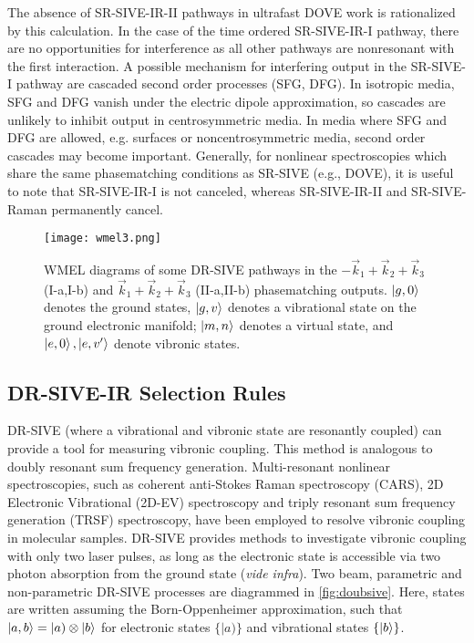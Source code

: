 \documentclass[aip, jcp, draft, onecolumn]{revtex4-2}
\begin{document}
The absence of SR-SIVE-IR-II pathways in ultrafast DOVE work is rationalized by this calculation. \cite{RN367, McDonnell2024}
In the case of the time ordered SR-SIVE-IR-I pathway, there are no opportunities for interference as all other pathways are nonresonant with the first interaction. 
A possible mechanism for interfering output in the SR-SIVE-I pathway are cascaded second order processes (SFG, DFG). \cite{RN243, RN300}
In isotropic media, SFG and DFG vanish under the electric dipole approximation,\cite{Zhu87} so cascades are unlikely to inhibit output in centrosymmetric media.
In media where SFG and DFG are allowed, e.g. surfaces or noncentrosymmetric media, second order cascades may become important. 
Generally, for nonlinear spectroscopies which share the same phasematching conditions as SR-SIVE (e.g., DOVE), it is useful to note that SR-SIVE-IR-I is not canceled, whereas SR-SIVE-IR-II and SR-SIVE-Raman permanently cancel.

\begin{figure}[!htbp]
	\centering
	\texttt{[image: wmel3.png]}
	\caption{WMEL diagrams of some DR-SIVE pathways in the $-\vec{k}_1 + \vec{k}_2+ \vec{k}_3$  (I-a,I-b) and $\vec{k}_1 + \vec{k}_2+ \vec{k}_3$ (II-a,II-b) phasematching outputs. $\ket{g,0}$ denotes the ground states, $\ket{g,v}$ denotes a vibrational state on the ground electronic manifold; $\ket{m,n}$ denotes a virtual state, and $\ket{e,0}, \ket{e,v'}$ denote vibronic states.}
	\label{fig:doubsive}
\end{figure}

\subsection{DR-SIVE-IR Selection Rules} %
DR-SIVE (where a vibrational and vibronic state are resonantly coupled) can provide a tool for measuring vibronic coupling.
This method is analogous to doubly resonant sum frequency generation. \cite{Shen94}
Multi-resonant nonlinear spectroscopies, such as coherent anti-Stokes Raman spectroscopy (CARS), 2D Electronic Vibrational (2D-EV) spectroscopy and triply resonant sum frequency generation (TRSF) spectroscopy, have been employed to resolve vibronic coupling in molecular samples. \cite{Carlson1990, Gaynor2017, RN276}
DR-SIVE provides methods to investigate vibronic coupling with only two laser pulses, as long as the electronic state is accessible via two photon absorption from the ground state (\textit{vide infra}).
Two beam, parametric and non-parametric DR-SIVE processes are diagrammed in \autoref{fig:doubsive}.
Here, states are written assuming the Born-Oppenheimer approximation, such that $\ket{a,b} = |a) \otimes \ket{b}$ for electronic states $\{|a)\}$ and vibrational states $\{\ket{b}\}$. \cite{BornOppenheimer, Albrecht1960}
\end{document}
